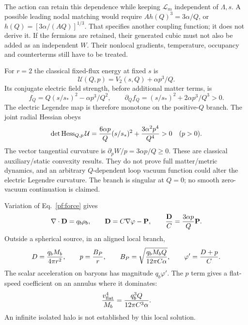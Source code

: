 \documentclass[11pt]{article}
\begin{document}
The action can retain this dependence while keeping $\mathcal L_m$
independent of $\Lambda,s$. A possible leading nodal matching would
require $A h(Q)^3=3\alpha/Q$, or
$h(Q)=[3\alpha/(AQ)]^{1/3}$. That specifies another coupling function;
it does not derive it. If the fermions are retained, their generated cubic
must not also be added as an independent $W$. Their nonlocal gradients,
temperature, occupancy and counterterms still have to be treated.

For $r=2$ the classical fixed-flux energy at fixed $s$ is
\begin{equation}
 \mathcal U(Q,p)=V_2(s,Q)+\alpha p^3/Q.
\end{equation}
Its conjugate electric field strength, before additional matter terms, is
\begin{equation}
 f_Q=Q(s/s_*)^2-\alpha p^3/Q^2,\qquad
 \partial_Qf_Q=(s/s_*)^2+2\alpha p^3/Q^3>0.
\end{equation}
The electric Legendre map is therefore monotone on the positive-$Q$
branch. The joint radial Hessian obeys
\begin{equation}
 \det\operatorname{Hess}_{Q,p}\mathcal U
 ={6\alpha p\over Q}(s/s_*)^2
             +{3\alpha^2p^4\over Q^4}>0\quad(p>0).
\end{equation}
The vector tangential curvature is $\partial_pW/p=3\alpha p/Q\geq0$.
These are classical auxiliary/static convexity results. They do not prove
full matter/metric dynamics, and an arbitrary $Q$-dependent loop vacuum
function could alter the electric Legendre curvature. The branch is
singular at $Q=0$; no smooth zero-vacuum continuation is claimed.

Variation of Eq.~\eqref{pf:force} gives
\begin{equation}
 \nabla\cdot\mathbf D=q_b\rho_b,\qquad
 \mathbf D=C\nabla\varphi-\mathbf P,\qquad
 {\mathbf D\over C}={3\alpha p\over Q}\mathbf P.
\end{equation}
Outside a spherical source, in an aligned local branch,
\begin{equation}
 D={q_bM_b\over4\pi r^2},\qquad
 p={B_P\over r},\qquad
 B_P=\sqrt{{q_bM_bQ\over12\pi C\alpha}},\qquad
 \varphi'={D+p\over C}.
\end{equation}
The scalar acceleration on baryons has magnitude $q_b\varphi'$.
The $p$ term gives a flat-speed coefficient on an annulus where it dominates:
\begin{equation}
 {v_{\rm flat}^4\over M_b}={q_b^3Q\over12\pi C^3\alpha}.
 \label{pf:TF}
\end{equation}
An infinite isolated halo is not established by this local solution.
\end{document}
